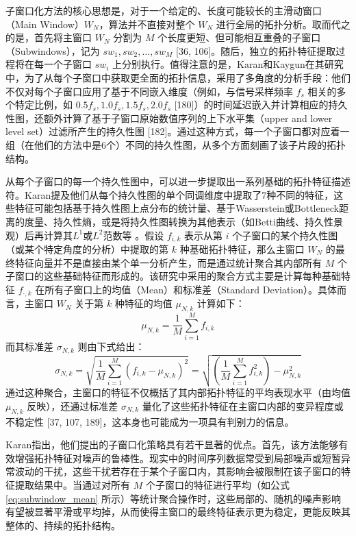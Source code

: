        子窗口化方法的核心思想是，对于一个给定的、长度可能较长的主滑动窗口（Main Window）$W_N$，算法并不直接对整个 $W_N$ 进行全局的拓扑分析。取而代之的是，首先将主窗口 $W_N$ 分割为 $M$ 个长度更短、但可能相互重叠的子窗口（Subwindows），记为 $sw_1, sw_2, \dots, sw_M$ [36, 106]。随后，独立的拓扑特征提取过程将在每一个子窗口 $sw_i$ 上分别执行。值得注意的是，Karan和Kaygun在其研究中，为了从每个子窗口中获取更全面的拓扑信息，采用了多角度的分析手段：他们不仅对每个子窗口应用了基于不同嵌入维度（例如，与信号采样频率 $f_s$ 相关的多个特定比例，如 $0.5f_s, 1.0f_s, 1.5f_s, 2.0f_s$ [180]）的时间延迟嵌入并计算相应的持久性图，还额外计算了基于子窗口原始数值序列的上下水平集（upper and lower level set）过滤所产生的持久性图 [182]。通过这种方式，每一个子窗口都对应着一组（在他们的方法中是6个）不同的持久性图，从多个方面刻画了该子片段的拓扑结构。
        
        从每个子窗口的每一个持久性图中，可以进一步提取出一系列基础的拓扑特征描述符。Karan提及他们从每个持久性图的单个同调维度中提取了7种不同的特征，这些特征可能包括基于持久性图上点分布的统计量、基于Wasserstein或Bottleneck距离的度量、持久性熵，或是将持久性图转换为其他表示（如Betti曲线、持久性景观）后再计算其$L^1$或$L^2$范数等 。假设 $f_{i,k}$ 表示从第 $i$ 个子窗口的某个持久性图（或某个特定角度的分析）中提取的第 $k$ 种基础拓扑特征，那么主窗口 $W_N$ 的最终特征向量并不是直接由某个单一分析产生，而是通过统计聚合其内部所有 $M$ 个子窗口的这些基础特征而形成的。该研究中采用的聚合方式主要是计算每种基础特征 $f_{\cdot,k}$ 在所有子窗口上的均值（Mean）和标准差（Standard Deviation）。具体而言，主窗口 $W_N$ 关于第 $k$ 种特征的均值 $\mu_{N,k}$ 计算如下：
        \begin{equation}
            \mu_{N,k} = \frac{1}{M} \sum_{i=1}^{M} f_{i,k}
            \label{eq:subwindow_mean}
        \end{equation}
        而其标准差 $\sigma_{N,k}$ 则由下式给出：
        \begin{equation}
            \sigma_{N,k} = \sqrt{\frac{1}{M}\sum_{i=1}^{M}(f_{i,k} - \mu_{N,k})^2} = \sqrt{\left(\frac{1}{M}\sum_{i=1}^{M}f_{i,k}^2\right) - \mu_{N,k}^2}
            \label{eq:subwindow_std}
        \end{equation}
        通过这种聚合，主窗口的特征不仅概括了其内部拓扑特征的平均表现水平（由均值 $\mu_{N,k}$ 反映），还通过标准差 $\sigma_{N,k}$ 量化了这些拓扑特征在主窗口内部的变异程度或不稳定性 [37, 107, 189]，这本身也可能成为一项具有判别力的信息。
        
        Karan指出，他们提出的子窗口化策略具有若干显著的优点。首先，该方法能够有效增强拓扑特征对噪声的鲁棒性。现实中的时间序列数据常受到局部噪声或短暂异常波动的干扰，这些干扰若存在于某个子窗口内，其影响会被限制在该子窗口的特征提取结果中。当通过对所有 $M$ 个子窗口的特征进行平均（如公式 \ref{eq:subwindow_mean} 所示）等统计聚合操作时，这些局部的、随机的噪声影响有望被显著平滑或平均掉，从而使得主窗口的最终特征表示更为稳定，更能反映其整体的、持续的拓扑结构。
        
